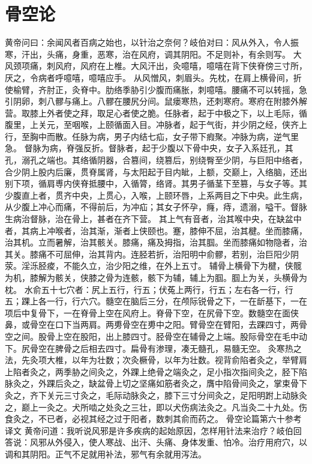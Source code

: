 \documentclass[a4paper,12pt,UTF8,twoside]{ctexbook}
\begin{document}
\chapter{骨空论}
黄帝问曰：余闻风者百病之始也，以针治之奈何？岐伯对曰：风从外入，令人振寒，汗出，头痛，身重，恶寒，治在风府，调其阴阳。不足则补，有余则写。
大风颈项痛，刺风府，风府在上椎。大风汗出，灸噫嘻，噫嘻在背下侠脊傍三寸所，厌之，令病者呼噫嘻，噫嘻应手。
从风憎风，刺眉头。先枕，在肩上横骨间，折使榆臂，齐肘正，灸脊中。肋络季胁引少腹而痛胀，刺噫嘻。腰痛不可以转摇，急引阴卵，刺八髎与痛上。八髎在腰尻分间。鼠瘘寒热，还刺寒府。寒府在附膝外解营。取膝上外者使之拜，取足心者使之脆。任脉者，起于中极之下，以上毛际，循腹里，上关元，至咽喉，上颐循面入目。冲脉者，起于气街，并少阴之经，侠齐上行，至胸中而散。任脉为病，男子内结七疝，女子带下瘕聚。冲脉为病，逆气里急。
督脉为病，脊强反折。督脉者，起于少腹以下骨中央，女子入系廷孔，其孔，溺孔之端也。其络循阴器，合篡间，绕篡后，别绕臀至少阴，与巨阳中络者，合少阴上股内后廉，贯脊属肾，与太阳起于目内眦，上额，交巅上，入络脑，还出别下项，循肩尃内侠脊抵腰中，入循膂，络肾。其男子循茎下至篡，与女子等。其少腹直上者，贯齐中央，上贯心，入喉，上颐环唇，上系两目之下中央。此生病，从少腹上冲心而痛，不得前后，为冲疝；其女子怀孕，癃，痔，遗溺，嗌干。督脉生病治督脉，治在骨上，甚者在齐下营。
其上气有音者，治其喉中央，在缺盆中者，其病上冲喉者，治其渐，渐者上侠颐也。蹇，膝伸不屈，治其楗。坐而膝痛，治其机。立而暑解，治其骸关。膝痛，痛及拇指，治其腘。坐而膝痛如物隐者，治其关。膝痛不可屈伸，治其背内。连胫若折，治阳明中俞髎，若别，治巨阳少阴荥。淫泺胫痠，不能久立，治少阳之维，在外上五寸。
辅骨上横骨下为楗，侠髋为机，膝解为骸关，侠膝之骨为连骸，骸下为辅，辅上为腘。腘上为关，头横骨为枕。
水俞五十七穴者：尻上五行，行五；伏菟上两行，行五；左右各一行，行五；踝上各一行，行六穴。髓空在脑后三分，在颅际锐骨之下，一在龂基下，一在项后中复骨下，一在脊骨上空在风府上。脊骨下空，在尻骨下空。数髓空在面侠鼻，或骨空在口下当两肩。两旉骨空在旉中之阳。臂骨空在臂阳，去踝四寸，两骨空之间。股骨上空在股阳，出上膝四寸。胫骨空在辅骨之上端。股际骨空在毛中动下。尻骨空在脾骨之后相去四寸。扁骨有渗理，凑无髓孔，易髓无空。
灸寒热之法，先灸项大椎，以年为壮数；次灸橛骨，以年为壮数。视背俞陷者灸之，举臂肩上陷者灸之，两季胁之间灸之，外踝上绝骨之端灸之，足小指次指间灸之，胫下陷脉灸之，外踝后灸之，缺盆骨上切之坚痛如筋者灸之，膺中陷骨间灸之，掌束骨下灸之，齐下关元三寸灸之，毛际动脉灸之，膝下三寸分间灸之，足阳明跗上动脉灸之，巅上一灸之。犬所啮之处灸之三壮，即以犬伤病法灸之。凡当灸二十九处。伤食灸之，不已者，必视其经之过于阳者，数刺其俞而药之。
骨空论篇第六十参考译文
黄帝问道：我听说风邪是许多疾病的起始原因，怎样用针法来治疗？岐伯回答说：风邪从外侵入，使人寒战、出汗、头痛、身体发重、怕冷。治疗用府穴，以调和其阴阳。正气不足就用补法，邪气有余就用泻法。
\end{document}
